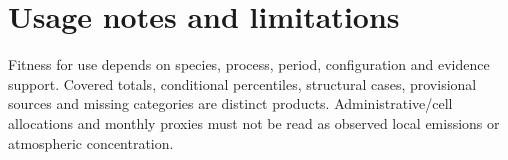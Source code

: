 \section{Usage notes and limitations}\label{sec:usage}
Fitness for use depends on species, process, period, configuration and evidence support. Covered totals, conditional percentiles, structural cases, provisional sources and missing categories are distinct products. Administrative/cell allocations and monthly proxies must not be read as observed local emissions or atmospheric concentration.
\pkinvLeadFragment

\pkinvEndFragment
\pkinvDemoteFragment

\pkinvEndFragment

